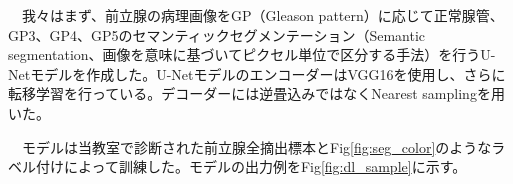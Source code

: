 　我々はまず、前立腺の病理画像をGP（Gleason pattern）に応じて正常腺管、GP3、GP4、GP5のセマンティックセグメンテーション（Semantic segmentation、画像を意味に基づいてピクセル単位で区分する手法）を行うU-Net\cite{unet}モデルを作成した。U-NetモデルのエンコーダーはVGG16\cite{vgg}を使用し、さらに転移学習を行っている\cite{ternausnet}。デコーダーには逆畳込みではなくNearest samplingを用いた。\par

\vspace{0.5zh}

　モデルは当教室で診断された前立腺全摘出標本とFig\ref{fig:seg_color}のようなラベル付けによって訓練した。モデルの出力例をFig\ref{fig:dl_sample}に示す。\par

\vspace{-1zh}


